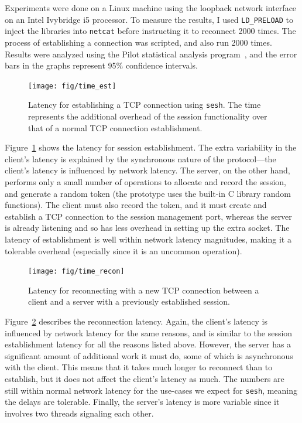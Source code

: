 \documentclass[twocolumn,10pt]{article}
\newcommand{\sesh}{\texttt{sesh}\xspace}
\begin{document}
Experiments were done on a Linux machine using the loopback network
interface on an Intel Ivybridge i5 processor. To measure the results, I used
\texttt{LD\_PRELOAD} to inject the libraries into \texttt{netcat} before
instructing it to reconnect 2000 times. The process of establishing a connection
was scripted, and also run 2000 times. Results were analyzed using the Pilot
statistical analysis program~\cite{pilot}, and the error bars in the graphs
represent 95\% confidence intervals.

\begin{figure}[!htb]
	\centering
	\texttt{[image: fig/time\_est]}
	\caption{Latency for establishing a TCP connection using \sesh. The time
	represents the additional overhead of the session functionality over that of
	a normal TCP connection establishment.}
	\label{fig:est}
\end{figure}

Figure~\ref{fig:est} shows the latency for session establishment. The extra
variability in the client's latency is explained by the synchronous nature of
the protocol---the client's latency is influenced by network latency. The
server, on the other hand, performs only a small number of operations to
allocate and record the session, and generate a random token (the prototype uses
the built-in C library random functions). The client must also record the token,
and it must create and establish a TCP connection to the session management
port, whereas the server is already listening and so has less overhead in
setting up the extra socket.
The latency of establishment is well within network latency magnitudes, making
it a tolerable overhead (especially since it is an uncommon operation).

\begin{figure}[!htb]
	\centering
	\texttt{[image: fig/time\_recon]}
	\caption{Latency for reconnecting with a new TCP connection between a client
	and a server with a previously established session.}
	\label{fig:recon}
\end{figure}

Figure~\ref{fig:recon} describes the reconnection latency. Again, the client's
latency is influenced by network latency for the same reasons, and is similar to
the session establishment latency for all the reasons listed above. However, the
server has a significant amount of additional work it must do, some of which is
asynchronous with the client. This means that it takes much longer to reconnect
than to establish, but it does not affect the client's latency as much. The
numbers are still within normal network latency for the use-cases we expect for
\sesh, meaning the delays are tolerable. Finally, the server's latency is more
variable since it involves two threads signaling each other.
\end{document}
